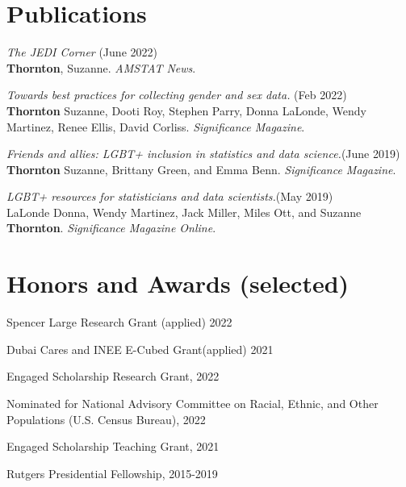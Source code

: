 \documentclass[margin,line]{res}
\begin{document}
\begin{resume}
\section{\sc Publications}  
\textit{The JEDI Corner} \hfill (June 2022)\\
{\bf Thornton}, Suzanne. {\em AMSTAT News}. 
\vspace*{-2.5mm}

\textit{Towards best practices for collecting gender and sex data.} \hfill (Feb 2022)\\
{\bf Thornton} Suzanne, Dooti Roy, Stephen Parry, Donna LaLonde, Wendy Martinez, Renee Ellis, David Corliss. {\em Significance Magazine}. 
\vspace*{-2.5mm}

\textit{Friends and allies: LGBT+ inclusion in statistics and data science.}\hfill (June 2019)\\
{\bf Thornton} Suzanne, Brittany Green, and Emma Benn. {\em Significance Magazine}. 
\vspace*{-2.5mm}

\textit{LGBT+ resources for statisticians and data scientists.}\hfill (May 2019)\\
LaLonde Donna, Wendy Martinez, Jack Miller, Miles Ott, and Suzanne {\bf Thornton}. {\em Significance Magazine Online}. 
\section{\sc Honors and Awards (selected)} 
Spencer Large Research Grant\footnotemark{} (applied) 2022 
\vspace*{-2.5mm}

Dubai Cares and INEE E-Cubed Grant\footnotemark[\value{footnote}] (applied) 2021
\vspace*{-2.5mm}

Engaged Scholarship Research Grant, 2022 
\vspace*{-2.5mm}

Nominated for National Advisory Committee on Racial, Ethnic, and Other Populations (U.S. Census Bureau), 2022  

Engaged Scholarship Teaching Grant, 2021
\vspace*{-2.5mm}

Rutgers Presidential Fellowship, 2015-2019
\vspace*{-2.5mm}


\end{resume}
\end{document}
